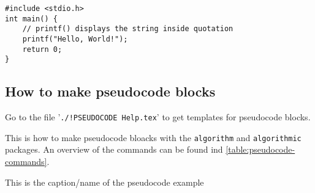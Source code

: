 
\begin{verbatim}
#include <stdio.h>
int main() {
    // printf() displays the string inside quotation
    printf("Hello, World!");
    return 0;
}
\end{verbatim}

\subsection{How to make pseudocode blocks}

Go to the file '\texttt{./!PSEUDOCODE Help.tex}' to get templates for pseudocode blocks.

This is how to make pseudocode bloacks with the \texttt{algorithm} and
\texttt{algorithmic} packages. An overview of the commands can be found ind
\autoref{table:pseudocode-commands}.

\begin{algorithm}
    \caption{This is the caption/name of the pseudocode example}
    \label{alg:pseudocode}
    \begin{algorithmic}[1]
        \EndFor
            \EndFor
        \EndFunction
    \end{algorithmic}
\end{algorithm}

